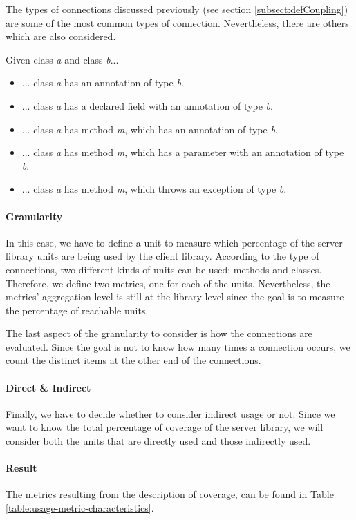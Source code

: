 The types of connections discussed previously (see section \ref{subsect:defCoupling}) are some of the most common types of connection. Nevertheless, there are others which are also considered.

Given class \textit{a} and class \textit{b}...

\begin{itemize}
  \item ... class \textit{a} has an annotation of type \textit{b}.
  \item ... class \textit{a} has a declared field with an annotation of type \textit{b}.
  \item ... class \textit{a} has method \textit{m}, which has an annotation of type \textit{b}.
  \item ... class \textit{a} has method \textit{m}, which has a parameter with an annotation of type \textit{b}.
  \item ... class \textit{a} has method \textit{m}, which throws an exception of type \textit{b}.
\end{itemize}

\paragraph{Granularity}
In this case, we have to define a unit to measure which percentage of the server library units are being used by the client library. According to the type of connections, two different kinds of units can be used: methods and classes. Therefore, we define two metrics, one for each of the units. Nevertheless, the metrics' aggregation level is still at the library level since the goal is to measure the percentage of reachable units.

The last aspect of the granularity to consider is how the connections are evaluated. Since the goal is not to know how many times a connection occurs, we count the distinct items at the other end of the connections.

\paragraph{Direct \& Indirect}
Finally, we have to decide whether to consider indirect usage or not. Since we want to know the total percentage of coverage of the server library, we will consider both the units that are directly used and those indirectly used.

\paragraph{Result}
The metrics resulting from the description of coverage, can be found in Table \ref{table:usage-metric-characteristics}.

